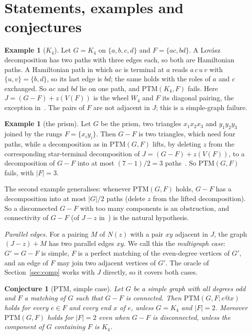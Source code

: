 \documentclass[11pt]{amsart}
\newtheorem{conjecture}[theorem]{Conjecture}
\theoremstyle{definition}
\newtheorem{example}[theorem]{Example}
\newcommand{\PTM}{\mathrm{PTM}}
\begin{document}
\section{Statements, examples and conjectures}\label{sec:statements}

\begin{example}[$K_4$]\label{ex:K4}
Let $G=K_4$ on $\{a,b,c,d\}$ and $F=\{ac,bd\}$. A Lov\'asz decomposition has two paths with three
edges each, so both are Hamiltonian paths. A Hamiltonian path in which $ac$ is terminal at $a$
reads $a\,c\,u\,v$ with $\{u,v\}=\{b,d\}$, so its last edge is $bd$; the same holds with the roles
of $a$ and $c$ exchanged. So $ac$ and $bd$ lie on one path, and $\PTM(K_4,F)$ fails. Here
$J=(G-F)+z(V(F))$ is the wheel $W_4$ and $F$ its diagonal pairing, the exception
in~\cite[Example~4.5]{STL}. The pairs of $F$ are not adjacent in $J$; this is a simple-graph
failure.
\end{example}

\begin{example}[the prism]\label{ex:prism}
Let $G$ be the prism, two triangles $x_1x_2x_3$ and $y_1y_2y_3$ joined by the rungs
$F=\{x_iy_i\}$. Then $G-F$ is two triangles, which need four paths, while a decomposition as in
$\PTM(G,F)$ lifts, by deleting $z$ from the corresponding star-terminal decomposition
of $J=(G-F)+z(V(F))$, to a decomposition of $G-F$ into at most $(7-1)/2=3$
paths~\cite[Lemma~3.1]{STL}. So $\PTM(G,F)$ fails, with $|F|=3$.
\end{example}

The second example generalises: whenever $\PTM(G,F)$ holds, $G-F$ has a decomposition into at
most $|G|/2$ paths (delete $z$ from the lifted decomposition). So a disconnected $G-F$ with too
many components is an obstruction, and connectivity of $G-F$ (of $J-z$ in~\cite{STL}) is the
natural hypothesis.

\emph{Parallel edges.} For a pairing $M$ of $N(z)$ with a pair $xy$ adjacent in $J$, the graph
$(J-z)+M$ has two parallel edges $xy$. We call this the \emph{multigraph case}: $G'=G-F$ is
simple, $F$ is a perfect matching of the even-degree vertices of $G'$, and an edge of $F$ may
join two adjacent vertices of $G'$. The oracle of Section~\ref{sec:comp} works with $J$
directly, so it covers both cases.

\begin{conjecture}[$\PTM$, simple case]\label{conj:ptm}
Let $G$ be a simple graph with all degrees odd and $F$ a matching of $G$ such that $G-F$ is
connected. Then $\PTM(G,F;e@x)$ holds for every $e\in F$ and every end $x$ of $e$, unless $G=K_4$
and $|F|=2$. Moreover $\PTM(G,F)$ holds for $|F|=2$ even when $G-F$ is disconnected, unless the
component of $G$ containing $F$ is $K_4$.
\end{conjecture}
\end{document}
